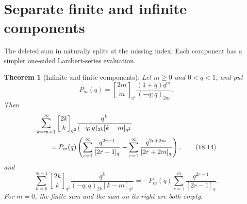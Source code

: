 \documentclass[11pt,oneside,openany]{book}
\newtheorem{theorem}{Theorem}[chapter]
\theoremstyle{definition}
\theoremstyle{remark}
\newcommand{\Qbinom}[3]{\genfrac{[}{]}{0pt}{}{#1}{#2}_{#3}}
\begin{document}
\section{Separate finite and infinite components}

The deleted sum in  naturally splits at the missing
index.  Each component has a simpler one-sided Lambert-series evaluation.

\begin{theorem}[Infinite and finite components]\label{thm:central-components}
Let $m\ge0$ and $0<q<1$, and put
\[
 P_m(q)=\Qbinom{2m}{m}{q^2}
 \frac{(1+q)q^m}{(-q;q)_{2m}}.
\]
Then
\begin{align}
 &\sum_{k=m+1}^{\infty}
 \Qbinom{2k}{k}{q^2}
 \frac{q^k}{(-q;q)_{2k}[k-m]_{q^2}}
 \notag\\
 &\qquad=P_m(q)\left(
 \sum_{r=1}^{\infty}\frac{q^{2r-1}}{[2r-1]_q}
 -\sum_{r=1}^{\infty}\frac{q^{2r+2m}}{[2r+2m]_q}
 \right),
 \tag{18.14}\label{eq:central-infinite-component}
\end{align}
and
\[
 \sum_{k=0}^{m-1}
 \Qbinom{2k}{k}{q^2}
 \frac{q^k}{(-q;q)_{2k}[k-m]_{q^2}}
 =-P_m(q)\sum_{r=1}^{m}\frac{q^{2r-1}}{[2r-1]_q}.
 \tag{18.15}\label{eq:central-finite-component}
\]
For $m=0$, the finite sum and the sum on its right are both empty.
\end{theorem}
\end{document}
